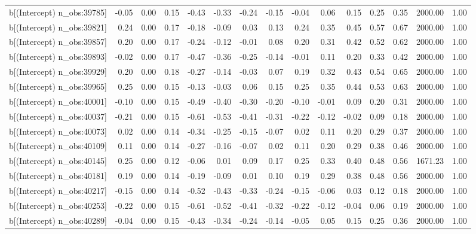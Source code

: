 \begin{table}[ht]
\begin{tabular}{rrrrrrrrrrrrrrr}
  b[(Intercept) n\_obs:39785] & -0.05 & 0.00 & 0.15 & -0.43 & -0.33 & -0.24 & -0.15 & -0.04 & 0.06 & 0.15 & 0.25 & 0.35 & 2000.00 & 1.00 \\ 
  b[(Intercept) n\_obs:39821] & 0.24 & 0.00 & 0.17 & -0.18 & -0.09 & 0.03 & 0.13 & 0.24 & 0.35 & 0.45 & 0.57 & 0.67 & 2000.00 & 1.00 \\ 
  b[(Intercept) n\_obs:39857] & 0.20 & 0.00 & 0.17 & -0.24 & -0.12 & -0.01 & 0.08 & 0.20 & 0.31 & 0.42 & 0.52 & 0.62 & 2000.00 & 1.00 \\ 
  b[(Intercept) n\_obs:39893] & -0.02 & 0.00 & 0.17 & -0.47 & -0.36 & -0.25 & -0.14 & -0.01 & 0.11 & 0.20 & 0.33 & 0.42 & 2000.00 & 1.00 \\ 
  b[(Intercept) n\_obs:39929] & 0.20 & 0.00 & 0.18 & -0.27 & -0.14 & -0.03 & 0.07 & 0.19 & 0.32 & 0.43 & 0.54 & 0.65 & 2000.00 & 1.00 \\ 
  b[(Intercept) n\_obs:39965] & 0.25 & 0.00 & 0.15 & -0.13 & -0.03 & 0.06 & 0.15 & 0.25 & 0.35 & 0.44 & 0.53 & 0.63 & 2000.00 & 1.00 \\ 
  b[(Intercept) n\_obs:40001] & -0.10 & 0.00 & 0.15 & -0.49 & -0.40 & -0.30 & -0.20 & -0.10 & -0.01 & 0.09 & 0.20 & 0.31 & 2000.00 & 1.00 \\ 
  b[(Intercept) n\_obs:40037] & -0.21 & 0.00 & 0.15 & -0.61 & -0.53 & -0.41 & -0.31 & -0.22 & -0.12 & -0.02 & 0.09 & 0.18 & 2000.00 & 1.00 \\ 
  b[(Intercept) n\_obs:40073] & 0.02 & 0.00 & 0.14 & -0.34 & -0.25 & -0.15 & -0.07 & 0.02 & 0.11 & 0.20 & 0.29 & 0.37 & 2000.00 & 1.00 \\ 
  b[(Intercept) n\_obs:40109] & 0.11 & 0.00 & 0.14 & -0.27 & -0.16 & -0.07 & 0.02 & 0.11 & 0.20 & 0.29 & 0.38 & 0.46 & 2000.00 & 1.00 \\ 
  b[(Intercept) n\_obs:40145] & 0.25 & 0.00 & 0.12 & -0.06 & 0.01 & 0.09 & 0.17 & 0.25 & 0.33 & 0.40 & 0.48 & 0.56 & 1671.23 & 1.00 \\ 
  b[(Intercept) n\_obs:40181] & 0.19 & 0.00 & 0.14 & -0.19 & -0.09 & 0.01 & 0.10 & 0.19 & 0.29 & 0.38 & 0.48 & 0.56 & 2000.00 & 1.00 \\ 
  b[(Intercept) n\_obs:40217] & -0.15 & 0.00 & 0.14 & -0.52 & -0.43 & -0.33 & -0.24 & -0.15 & -0.06 & 0.03 & 0.12 & 0.18 & 2000.00 & 1.00 \\ 
  b[(Intercept) n\_obs:40253] & -0.22 & 0.00 & 0.15 & -0.61 & -0.52 & -0.41 & -0.32 & -0.22 & -0.12 & -0.04 & 0.06 & 0.19 & 2000.00 & 1.00 \\ 
  b[(Intercept) n\_obs:40289] & -0.04 & 0.00 & 0.15 & -0.43 & -0.34 & -0.24 & -0.14 & -0.05 & 0.05 & 0.15 & 0.25 & 0.36 & 2000.00 & 1.00 \\ 

\end{tabular}
\end{table}
